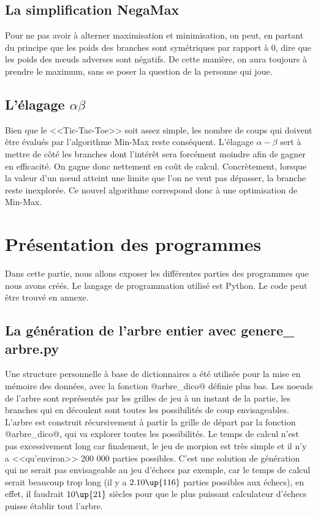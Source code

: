\documentclass{article}
\begin{document}
\subsection{La simplification NegaMax}

Pour ne pas avoir à alterner maximisation et minimisation, on peut, en partant du principe que les poids des branches sont symétriques par rapport à 0, 
dire que les poids des nœuds adverses sont négatifs. De cette manière, on aura toujours à prendre le maximum, sans se poser la question de la personne qui joue.


\subsection{L'élagage $\alpha \beta$}

Bien que le <<Tic-Tac-Toe>> soit assez simple, les nombre de coups qui doivent être évalués par l'algorithme Min-Max reste conséquent. 
L'élagage $\alpha - \beta$ 
sert à mettre de côté les branches dont l'intérêt sera forcément moindre afin de gagner en efficacité. 
On gagne donc nettement en coût de calcul. 
Concrètement, lorsque la valeur d'un nœud atteint une limite que l'on ne veut pas dépasser, 
la branche reste inexplorée. Ce nouvel algorithme correspond donc à une optimisation de Min-Max.


\section{Présentation des programmes}

Dans cette partie, nous allons exposer les différentes parties des programmes que nous avons créés. Le langage de programmation utilisé est Python. Le code peut être trouvé en annexe.

\subsection{La génération de l'arbre entier avec genere\_ arbre.py }

Une structure personnelle à base de dictionnaires a été utilisée pour la mise en mémoire des données, avec la fonction @arbre_dico@ définie plus bas. Les noeuds de l'arbre sont représentés par les grilles de jeu à un instant de la partie, les branches qui en découlent sont toutes les possibilités de coup envisageables. L'arbre est construit récursivement à partir la grille de départ par la fonction @arbre_dico@, qui va explorer toutes les possibilités. Le temps de calcul n'est pas excessivement long car finalement, le jeu de morpion est très simple et il n'y a <<qu'environ>> 200 000 parties possibles. C'est une solution de génération qui ne serait pas envisageable au jeu d'échecs par exemple, car le temps de calcul serait beaucoup trop long (il y a $2.10\up{116}$ parties possibles aux échecs), en effet, il faudrait $10\up{21}$ siècles pour que le plus puissant calculateur d'échecs puisse établir tout l'arbre.
\end{document}

